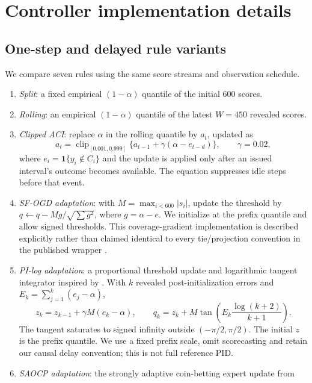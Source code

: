 \documentclass[preprint,11pt]{elsarticle}
\newcommand{\ind}{\mathbf{1}}
\newcommand{\clip}{\operatorname{clip}}
\begin{document}
\setlength{\bibsep}{4pt}

\clearpage
\section{Controller implementation details}\label{app:rules}
\subsection{One-step and delayed rule variants}
We compare seven rules using the same score streams and observation schedule.
\begin{enumerate}
\item \emph{Split}: a fixed empirical $(1-\alpha)$ quantile of the initial 600 scores.
\item \emph{Rolling}: an empirical $(1-\alpha)$ quantile of the latest $W=450$ revealed scores.
\item \emph{Clipped ACI}: replace $\alpha$ in the rolling quantile by $a_t$, updated as
\begin{equation}\label{eq:aciappendix}
 a_t=\clip_{[0.001,0.999]}\{a_{t-1}+\gamma(\alpha-e_{t-d})\},\qquad \gamma=0.02,
\end{equation}
where $e_i=\ind\{y_i\notin C_i\}$ and the update is applied only after an issued interval's
outcome becomes available. The equation suppresses idle steps before that event.
\item \emph{SF-OGD adaptation}: with $M=\max_{i<600}|s_i|$, update the threshold by
$q\leftarrow q-Mg/\sqrt{\sum g^2}$, where $g=\alpha-e$. We initialize at the prefix
quantile and allow signed thresholds. This coverage-gradient implementation is described
explicitly rather than claimed identical to every tie/projection convention in the
published wrapper \citep{bhatnagar2023saocp}.
\item \emph{PI-log adaptation}: a proportional threshold update and logarithmic tangent
integrator inspired by \citet{angelopoulos2023pid}. With $k$ revealed post-initialization
errors and $E_k=\sum_{j=1}^k(e_j-\alpha)$,
\begin{equation}\label{eq:pi}
 z_k=z_{k-1}+\gamma M(e_k-\alpha),\qquad
 q_k=z_k+M\tan\!\left(E_k\frac{\log(k+2)}{k+1}\right).
\end{equation}
The tangent saturates to signed infinity outside $(-\pi/2,\pi/2)$. The initial $z$ is the
prefix quantile. We use a fixed prefix scale, omit scorecasting and retain our causal
delay convention; this is not full reference PID.
\item \emph{SAOCP adaptation}: the strongly adaptive coin-betting expert update from

\end{enumerate}
\end{document}

